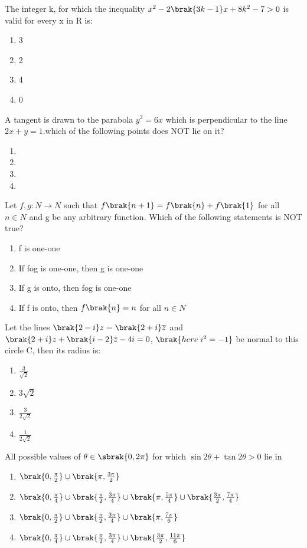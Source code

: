 \item The integer k, for which the inequality $x^{2}-2\brak{3k-1}x+8k^{2}-7>0$ is valid for every x in R is$\colon$ \hfill{}
\begin{enumerate}
    \item 3
    \item 2
    \item 4
    \item 0
\end{enumerate}
\item A tangent is drawn to the parabola $y^{2}=6x$ which is perpendicular to the line $2x+y=1$.which of the following points does NOT lie on it? \hfill{}
\begin{enumerate}
    \item {}
    \item {}
    \item {}
    \item {}
\end{enumerate}
\item Let $f,g\colon N\to N$ such that $f\brak{n+1}=f\brak{n}+f\brak{1}$ for all $n\in N$ and g be any arbitrary function. Which of the following statements is NOT true? \hfill{}
\begin{enumerate}
    \item f is one-one
    \item If fog is one-one, then g is one-one
    \item If g is onto, then fog is one-one
    \item If f is onto, then $f\brak{n}=n$ for all $n \in N$
\end{enumerate}
\item Let the lines $\brak{2-i}z=\brak{2+i}\overline{z}$ and $\brak{2+i}z+\brak{i-2}\overline{z}-4i=0$, $\brak{here\; i^{2}=-1}$ be normal to this circle C, then its radius is$\colon$ \hfill{}
\begin{enumerate}
    \item $\frac{3}{\sqrt{2}}$
    \item $3\sqrt{2}$
    \item $\frac{3}{2\sqrt{2}}$
    \item $\frac{1}{2\sqrt{2}}$
\end{enumerate}
\item All possible values of $\theta\in\sbrak{0,2\pi}$ for which $\sin2\theta+\tan2\theta>0$ lie in \hfill{}
\begin{enumerate}
    \item $\brak{0,\frac{\pi}{2}}\cup\brak{\pi,\frac{3\pi}{2}}$
    \item $\brak{0,\frac{\pi}{4}}\cup\brak{\frac{\pi}{2},\frac{3\pi}{4}}\cup\brak{\pi,\frac{5\pi}{4}}\cup\brak{\frac{3\pi}{2},\frac{7\pi}{4}}$
    \item $\brak{0,\frac{\pi}{2}}\cup\brak{\frac{\pi}{2},\frac{3\pi}{4}}\cup\brak{\pi,\frac{7\pi}{6}}$
    \item $\brak{0,\frac{\pi}{4}}\cup\brak{\frac{\pi}{2},\frac{3\pi}{4}}\cup\brak{\frac{3\pi}{2},\frac{11\pi}{6}}$
\end{enumerate}
